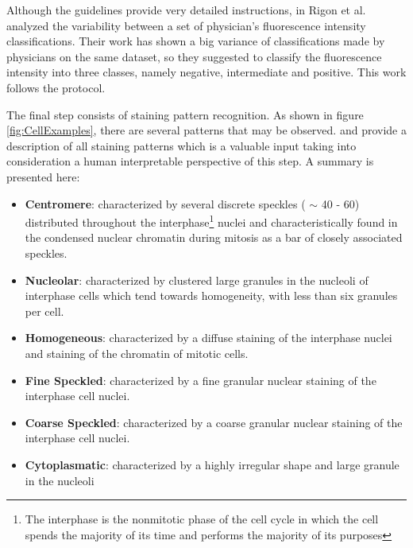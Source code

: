 Although the guidelines provide  very detailed instructions, in \cite{Rigon2007} Rigon et al. analyzed the variability between a set of physician's fluorescence intensity  classifications. Their work has shown a big variance of classifications made by physicians on the same dataset, so they suggested to classify the fluorescence intensity into three classes, namely negative, intermediate and positive. This work follows the protocol.

The final step consists of staining pattern recognition. As shown in figure \ref{fig:CellExamples}, there are several patterns that may be observed. \cite{FoggiaBenchmarks2013} and \cite{Perner02miningknowledge} provide a description of all staining patterns which is a valuable input taking into consideration a human interpretable perspective of this step. A summary is presented here:
\begin{itemize}

	\item \textbf{Centromere}: characterized by several discrete speckles ( $\sim$ 40 - 60) distributed throughout the interphase\footnote{The interphase is the nonmitotic phase of the cell cycle in which the cell spends the majority of its time and performs the majority of its purposes} nuclei and characteristically found in the condensed nuclear chromatin during mitosis as a bar of closely associated speckles.
	
	\item \textbf{Nucleolar}: characterized by clustered large granules in
the nucleoli of interphase cells which tend towards homogeneity, with less than six granules per cell.

	\item \textbf{Homogeneous}: characterized by a diffuse staining of the interphase nuclei and staining of the chromatin of mitotic cells.
	
	\item \textbf{Fine Speckled}: characterized by a fine granular nuclear staining of the interphase cell nuclei.
	
	\item \textbf{Coarse Speckled}: characterized by a coarse granular nuclear staining of the interphase cell nuclei.
	
	\item \textbf{Cytoplasmatic}: characterized by a highly irregular shape and large granule in the nucleoli

\end{itemize}
